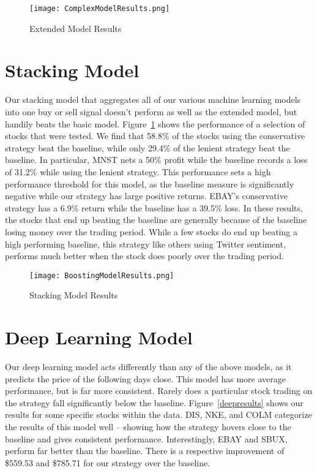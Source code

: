 \documentclass[../thesis.tex]{subfiles}
\begin{document}
\begin{figure}[h]
\centering
\texttt{[image: ComplexModelResults.png]}
\caption{Extended Model Results \label{overflow}}
\label{complexresults}
\end{figure}

\section{Stacking Model}
Our stacking model that aggregates all of our various machine learning models into one buy or sell signal doesn't perform as well as the extended model, but handily beats the basic model. Figure~\ref{complexresults} shows the performance of a selection of stocks that were tested. We find that 58.8\% of the stocks using the conservative strategy beat the baseline, while only 29.4\% of the lenient strategy beat the baseline. In particular, MNST nets a 50\% profit while the baseline records a loss of 31.2\% while using the lenient strategy. This performance sets a high performance threshold for this model, as the baseline measure is significantly negative while our strategy has large positive returns. EBAY's conservative strategy has a 6.9\% return while the baseline has a 39.5\% loss. In these results, the stocks that end up beating the baseline are generally because of the baseline losing money over the trading period. While a few stocks do end up beating a high performing baseline, this strategy like others using Twitter sentiment, performs much better when the stock does poorly over the trading period. 

\begin{figure}[h]
\centering
\texttt{[image: BoostingModelResults.png]}
\caption{Stacking Model Results \label{overflow}}
\label{stackingresults}
\end{figure}

\section{Deep Learning Model}
Our deep learning model acts differently than any of the above models, as it predicts the price of the following days close. This model has more average performance, but is far more consistent. Rarely does a particular stock trading on the strategy fall significantly below the baseline. Figure~\ref{deepresults} shows our results for some specific stocks within the data. DIS, NKE, and COLM categorize the results of this model well -- showing how the strategy hovers close to the baseline and gives consistent performance. Interestingly, EBAY and SBUX, perform far better than the baseline. There is a respective improvement of \$559.53 and \$785.71 for our strategy over the baseline. 
\end{document}
